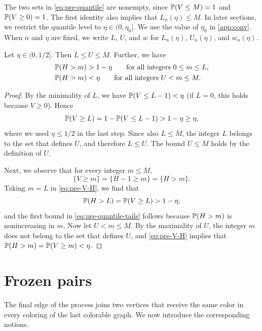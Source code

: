 The two sets in \eqref{eq:pre-quantile} are nonempty, since $\mathbb P(V \le M) = 1$ and $\mathbb P(V \ge 0) = 1$. The first identity also implies that $L_n(\eta) \le M$. In later sections, we restrict the quantile level to $\eta \in (0, \eta_0]$. We use the value of $\eta_0$ in \cref{app:conv}. When $n$ and $\eta$ are fixed, we write $L$, $U$, and $w$ for $L_n(\eta)$, $U_n(\eta)$, and $w_n(\eta)$.

\begin{lemma}\label{lem:pre-quantile}
Let $\eta \in (0, 1/2]$. Then $L \le U \le M$. Further, we have
\begin{equation}\label{eq:pre-quantile-tails}
\begin{aligned}
\mathbb P(H > m) &> 1 - \eta \qquad \text{for all integers } 0 \le m \le L, \\
\mathbb P(H > m) &< \eta \qquad \text{for all integers } U < m \le M.
\end{aligned}
\end{equation}
\end{lemma}

\begin{proof}
By the minimality of $L$, we have $\mathbb P(V \le L - 1) < \eta$ (if $L = 0$, this holds because $V \ge 0$). Hence
\[
\mathbb P(V \ge L) = 1 - \mathbb P(V \le L - 1) > 1 - \eta \ge \eta,
\]
where we used $\eta \le 1/2$ in the last step. Since also $L \le M$, the integer $L$ belongs to the set that defines $U$, and therefore $L \le U$. The bound $U \le M$ holds by the definition of $U$.

Next, we observe that for every integer $m \le M$,
\begin{equation}\label{eq:pre-V-H}
\{V \ge m\} = \{H - 1 \ge m\} = \{H > m\}.
\end{equation}
Taking $m = L$ in \eqref{eq:pre-V-H}, we find that
\[
\mathbb P(H > L) = \mathbb P(V \ge L) > 1 - \eta,
\]
and the first bound in \eqref{eq:pre-quantile-tails} follows because $\mathbb P(H > m)$ is nonincreasing in $m$. Now let $U < m \le M$. By the maximality of $U$, the integer $m$ does not belong to the set that defines $U$, and \eqref{eq:pre-V-H} implies that $\mathbb P(H > m) = \mathbb P(V \ge m) < \eta$.
\end{proof}

\section{Frozen pairs}\label{sec:pre-frozen}

The final edge of the process joins two vertices that receive the same color in every coloring of the last colorable graph. We now introduce the corresponding notions.

